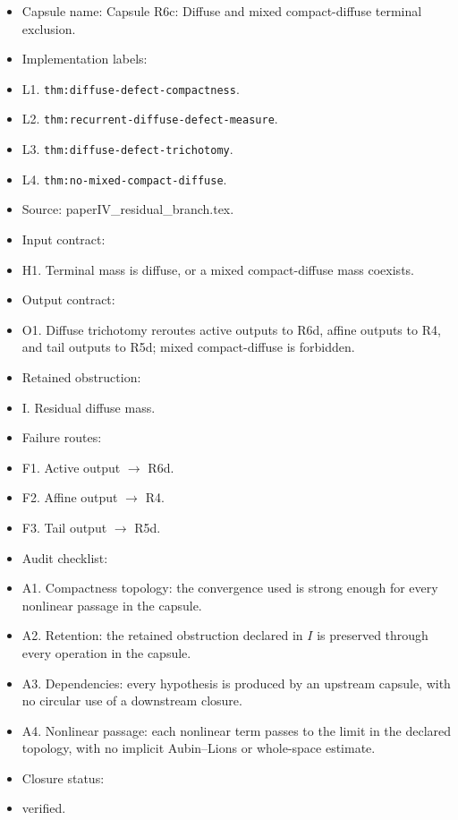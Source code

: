 \documentclass[11pt]{amsart}
\begin{document}
\begin{itemize}
  \item Capsule name: Capsule R6c: Diffuse and mixed compact-diffuse terminal exclusion.
  \item Implementation labels:
  \item L1. \texttt{thm:diffuse-defect-compactness}.
  \item L2. \texttt{thm:recurrent-diffuse-defect-measure}.
  \item L3. \texttt{thm:diffuse-defect-trichotomy}.
  \item L4. \texttt{thm:no-mixed-compact-diffuse}.
  \item Source: paperIV\_residual\_branch.tex.
  \item Input contract:
  \item H1. Terminal mass is diffuse, or a mixed compact-diffuse mass coexists.
  \item Output contract:
  \item O1. Diffuse trichotomy reroutes active outputs to R6d, affine outputs to R4, and tail outputs to R5d; mixed compact-diffuse is forbidden.
  \item Retained obstruction:
  \item I. Residual diffuse mass.
  \item Failure routes:
  \item F1. Active output $\to$ R6d.
  \item F2. Affine output $\to$ R4.
  \item F3. Tail output $\to$ R5d.
  \item Audit checklist:
  \item A1. Compactness topology: the convergence used is strong enough for every nonlinear passage in the capsule.
  \item A2. Retention: the retained obstruction declared in $I$ is preserved through every operation in the capsule.
  \item A3. Dependencies: every hypothesis is produced by an upstream capsule, with no circular use of a downstream closure.
  \item A4. Nonlinear passage: each nonlinear term passes to the limit in the declared topology, with no implicit Aubin--Lions or whole-space estimate.
  \item Closure status:
  \item verified.
\end{itemize}
\end{document}
